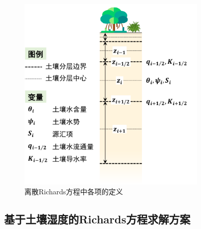 {
  \begin{figure}[htb]
    \centering
    \includegraphics[width=0.8\textwidth]{Figures/植被冠层和土壤水分/土壤水离散.pdf}
    \caption{离散Richards方程中各项的定义}
    \label{fig:土壤水离散}
  \end{figure}
}

\subsection{基于土壤湿度的Richards方程求解方案}

